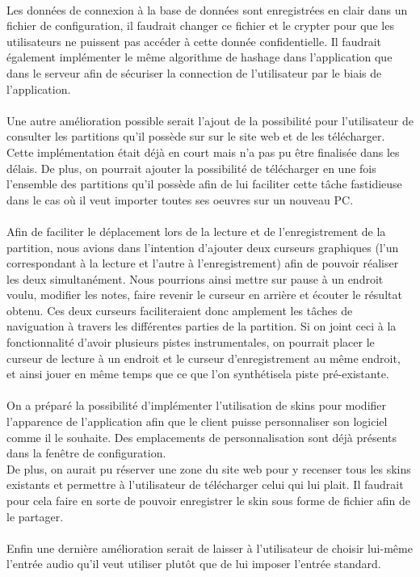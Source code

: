 \paragraph{}
Les données de connexion à la base de données sont enregistrées en clair dans un fichier de configuration, il faudrait changer 
ce fichier et le crypter pour que les utilisateurs ne puissent pas accéder à cette donnée confidentielle. Il faudrait également 
implémenter le même algorithme de hashage dans l'application que dans le serveur afin de sécuriser la connection de l'utilisateur 
par le biais de l'application. 

\paragraph{}
Une autre amélioration possible serait l'ajout de la possibilité pour l'utilisateur de consulter les partitions qu'il possède sur sur le site web et de les télécharger. Cette implémentation était déjà en court mais n'a pas pu être finalisée dans les délais.
De plus, on pourrait ajouter la possibilité de télécharger en une fois l'ensemble des partitions qu'il possède afin de lui faciliter cette tâche fastidieuse dans le cas où il veut importer toutes ses oeuvres sur un nouveau PC.

\paragraph{}
Afin de faciliter le déplacement lors de la lecture et de l'enregistrement de la partition, nous avions dans l'intention d'ajouter 
deux curseurs graphiques (l'un correspondant à la lecture et l'autre à l'enregistrement) afin de pouvoir réaliser les deux simultanément. Nous pourrions ainsi mettre sur pause à un endroit voulu, modifier les notes, faire revenir le curseur en arrière et 
écouter le résultat obtenu. Ces deux curseurs faciliteraient donc amplement les tâches de naviguation à travers les différentes parties de la partition. 
Si on joint ceci à la fonctionnalité d'avoir plusieurs pistes instrumentales, on pourrait placer le curseur de lecture à un endroit et le curseur 
d'enregistrement au même endroit, et ainsi jouer en même temps que ce que l'on synthétisela piste pré-existante.

\paragraph{}
On a préparé la possibilité d'implémenter l'utilisation de skins pour modifier l'apparence de l'application afin que le client puisse personnaliser son logiciel comme il le souhaite. Des emplacements de personnalisation sont déjà présents dans la fenêtre de configuration.\\
De plus, on aurait pu réserver une zone du site web pour y recenser tous les skins existants et permettre à l'utilisateur de télécharger celui qui lui plait. 
Il faudrait pour cela faire en sorte de pouvoir enregistrer le skin sous forme de fichier afin de le partager. 

\paragraph{}
Enfin une dernière amélioration serait de laisser à l'utilisateur de choisir lui-même l'entrée audio qu'il veut utiliser plutôt que de lui imposer l'entrée standard.
